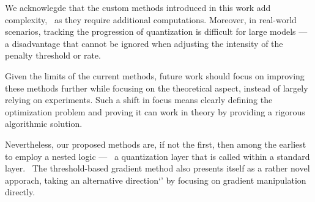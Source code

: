 We acknowlegde that the custom methods introduced in this work add complexity, \
as they require additional computations. 
Moreover, in real-world scenarios, tracking the progression of quantization is difficult for large models — a disadvantage that cannot be ignored when adjusting the intensity of the penalty threshold or rate. \

Given the limits of the current methods, 
future work should focus on improving these methods further while focusing on the theoretical aspect, 
instead of largely relying on experiments. 
Such a shift in focus means clearly defining the optimization problem and proving it can work in theory
by providing a rigorous algorithmic solution.

Nevertheless, our proposed methods are, if not the first, then among the earliest to employ a nested logic — \
a quantization layer that is called within a standard layer. \
The threshold-based gradient method also presents itself as a rather novel apporach, 
taking an alternative direction`' by focusing on gradient manipulation directly.